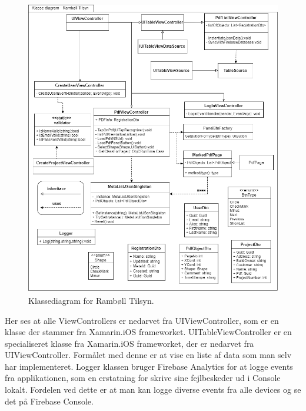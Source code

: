 \begin{figure}[H] %
	\centering
	\includegraphics[height=13cm, width=17cm]{../ArkitekturDesign/OverordnetArkitektur/KlasseDiagram}
	\caption{Klassediagram for Rambøll Tilsyn.}
	\label{fig:KlasseDiagram}
\end{figure}

Her ses at alle ViewControllers er nedarvet fra UIViewController\cite{UIViewController}, som er en klasse der stammer fra Xamarin.iOS frameworket. UITableViewController er en specialiseret klasse fra Xamarin.iOS frameworket, der er nedarvet fra UIViewController. Formålet med denne er at vise en liste af data som man selv har implementeret. Logger klassen bruger Firebase Analytics for at logge events fra applikationen, som en erstatning for skrive sine fejlbeskeder ud i Console lokalt\cite{CON}. Fordelen ved dette er at man kan logge diverse events fra alle devices og se det på Firebase Console.  

